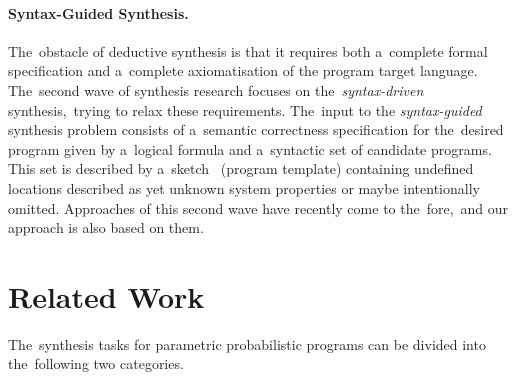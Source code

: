 \paragraph{Syntax-Guided Synthesis.}
The~obstacle of deductive synthesis is that it requires both a~complete formal specification and a~complete axiomatisation of the program target language.
The~second wave of synthesis research focuses on the~\textit{syntax-driven} synthesis,~trying to relax these requirements. 
The~input to the \textit{syntax-guided} synthesis problem consists of a~semantic correctness specification for the~desired program given by a~logical formula and a~syntactic set of candidate programs.
This set is described by a~sketch~\cite{sketching} (program template) containing undefined locations described as yet unknown system properties or maybe intentionally omitted. 
Approaches of this second wave have recently come to the~fore,~and our approach is also based on them. 

\section{Related Work}

The~synthesis tasks for parametric probabilistic programs can be divided into the~following two categories.

